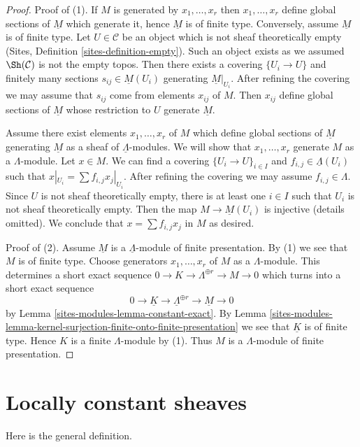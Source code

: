 \begin{proof}
Proof of (1). If $M$ is generated by $x_1, \ldots, x_r$ then
$x_1, \ldots, x_r$ define global sections of $\underline{M}$ which
generate it, hence $\underline{M}$ is of finite type. Conversely, assume
$\underline{M}$ is of finite type. Let $U \in \mathcal{C}$ be an object
which is not sheaf theoretically empty
(Sites, Definition \ref{sites-definition-empty}).
Such an object exists as we assumed $\Sh(\mathcal{C})$ is not
the empty topos. Then there exists a covering $\{U_i \to U\}$
and finitely many sections $s_{ij} \in \underline{M}(U_i)$ generating
$\underline{M}|_{U_i}$. After refining the covering we may assume
that $s_{ij}$ come from elements $x_{ij}$ of $M$. Then
$x_{ij}$ define global sections of $\underline{M}$ whose restriction
to $U$ generate $\underline{M}$.

\medskip\noindent
Assume there exist elements $x_1, \ldots, x_r$ of $M$ which define
global sections of $\underline{M}$ generating $\underline{M}$
as a sheaf of $\underline{\Lambda}$-modules. We will show that
$x_1, \ldots, x_r$ generate $M$ as a $\Lambda$-module.
Let $x \in M$. We can find a covering $\{U_i \to U\}_{i \in I}$
and $f_{i, j} \in \underline{\Lambda}(U_i)$ such that
$x|_{U_i} = \sum f_{i, j} x_j|_{U_i}$. After refining the covering
we may assume $f_{i, j} \in \Lambda$. Since $U$ is not
sheaf theoretically empty, there is at least one $i \in I$
such that $U_i$ is not sheaf theoretically empty.
Then the map $M \to \underline{M}(U_i)$ is injective (details omitted).
We conclude that $x = \sum f_{i, j}x_j$ in $M$ as desired.

\medskip\noindent
Proof of (2). Assume $\underline{M}$ is a $\underline{\Lambda}$-module
of finite presentation. By (1) we see that $M$ is of finite type.
Choose generators $x_1, \ldots, x_r$ of $M$ as a $\Lambda$-module.
This determines a short exact sequence
$0 \to K \to \Lambda^{\oplus r} \to M \to 0$ which
turns into a short exact sequence
$$
0 \to \underline{K} \to \underline{\Lambda}^{\oplus r} \to \underline{M} \to 0
$$
by Lemma \ref{sites-modules-lemma-constant-exact}. By
Lemma \ref{sites-modules-lemma-kernel-surjection-finite-onto-finite-presentation}
we see that $\underline{K}$ is of finite type. Hence $K$ is a
finite $\Lambda$-module by (1). Thus $M$ is a $\Lambda$-module
of finite presentation.
\end{proof}

\section{Locally constant sheaves}
\label{sites-modules-section-locally-constant}
Here is the general definition.

